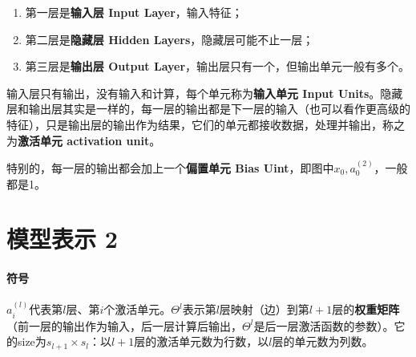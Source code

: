 \documentclass[../main.tex]{subfiles}
\begin{document}
\begin{figure}[H]
    \centering
\end{figure}

\begin{enumerate}
    \item 第一层是\textbf{输入层 Input Layer}，输入特征；
    \item 第二层是\textbf{隐藏层 Hidden Layers}，隐藏层可能不止一层；
    \item 第三层是\textbf{输出层 Output Layer}，输出层只有一个，但输出单元一般有多个。
\end{enumerate}

输入层只有输出，没有输入和计算，每个单元称为\textbf{输入单元 Input Units}。隐藏层和输出层其实是一样的，每一层的输出都是下一层的输入（也可以看作更高级的特征），只是输出层的输出作为结果，它们的单元都接收数据，处理并输出，称之为\textbf{激活单元 activation unit}。


特别的，每一层的输出都会加上一个\textbf{偏置单元 Bias Uint}，即图中\(x_0, a_0^{(2)}\)，一般都是1。

\section{模型表示 2}
\paragraph{符号} \(a_i^{(l)}\)代表第\(l\)层、第\(i\)个激活单元。\(Θ^{l}\)表示第\(l\)层映射（边）到第\(l+1\)层的\textbf{权重矩阵}（前一层的输出作为输入，后一层计算后输出，\(Θ^{l}\)是后一层激活函数的参数）。它的size为\(s_{l+1}×s_l\)：以\(l+1\)层的激活单元数为行数，以\(l\)层的单元数为列数。
\end{document}
